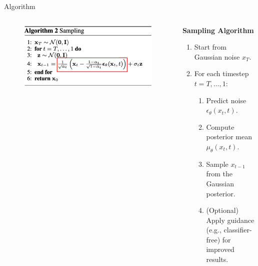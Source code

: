 \begin{frame}[allowframebreaks]{Algorithm}
\begin{columns}
    \begin{column}{0.5\textwidth}
        \begin{figure}
            \centering
            \includegraphics[height=0.7\textheight, width=\textwidth, keepaspectratio]{images/diffusion/diff_6.png}
        \end{figure}
    \end{column}
    \begin{column}{0.5\textwidth}
        \textbf{Sampling Algorithm}
        \begin{enumerate}
            \item Start from Gaussian noise $x_T$.
            \item For each timestep $t = T, \ldots, 1$:
            \begin{enumerate}
                \item Predict noise $\epsilon_\theta(x_t, t)$.
                \item Compute posterior mean $\mu_\theta(x_t, t)$.
                \item Sample $x_{t-1}$ from the Gaussian posterior.
                \item (Optional) Apply guidance (e.g., classifier-free) for improved results.
            \end{enumerate}
        \end{enumerate}
    \end{column}
\end{columns}
    
\end{frame}